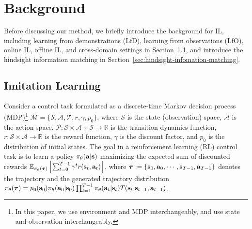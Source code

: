 
\section{Background}

Before discussing our method, we briefly introduce the background for IL, including learning from demonstrations (LfD), learning from observations (LfO), online IL, offline IL, and cross-domain settings in Section~\ref{sec:imitation-learning}, and introduce the hindsight information matching in Section~\ref{sec:hindsight-infomation-matching}. 

\subsection{Imitation Learning}
\label{sec:imitation-learning}

Consider a control task formulated as a discrete-time Markov decision process (MDP)\footnote{In this paper, we use environment and MDP interchangeably, and use state and observation interchangeably.} 
$\mathcal{M} = \{ \mathcal{S}, \mathcal{A}, \mathcal{T}, r, \gamma, p_0 \}$, where $\mathcal{S}$ is the state (observation) space, $\mathcal{A}$ is the action space, $\mathcal{P}: \mathcal{S} \times \mathcal{A} \times \mathcal{S} \to \mathbb{R}$ is the transition dynamics function, $r: \mathcal{S} \times \mathcal{A} \to \mathbb{R}$ is the reward function, $\gamma$ is the discount factor, and $p_0$ is the distribution of initial states. The goal in a reinforcement learning (RL) control task is to learn a policy $\pi_\theta(\mathbf{a}|\mathbf{s})$ maximizing the expected sum of discounted rewards  $\mathbb{E}_{\pi_\theta({\bm{\tau}})}\left[ \sum_{t=0}^{T-1} \gamma^t r(\mathbf{s}_t, \mathbf{a}_t) \right]$, where ${\bm{\tau}} := \{\mathbf{s}_0, \mathbf{a}_0, \cdots, \mathbf{s}_{T-1}, \mathbf{a}_{T-1}\}$ denotes the trajectory and the generated trajectory distribution $\pi_\theta({\bm{\tau}}) = p_0(\mathbf{s}_0)\pi_\theta(\mathbf{a}_0|\mathbf{s}_0)\prod_{t=1}^{T-1}\pi_\theta(\mathbf{a}_t|\mathbf{s}_t)T(\mathbf{s}_t|\mathbf{s}_{t-1}, \mathbf{a}_{t-1})$.

